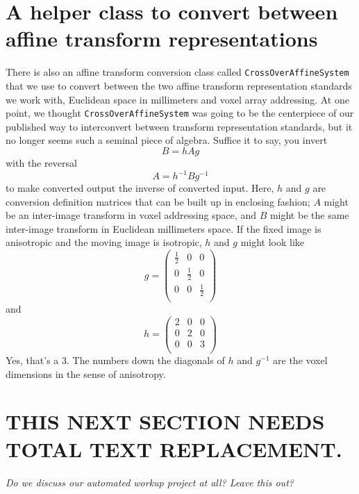 \documentclass [10pt,twocolumn,twoside,final,letterpaper]{report}
\newcommand{\bcode}{\texttt}
\begin{document}
\section{A helper class to convert between affine transform representations}
There is also an affine transform conversion class
called \bcode{CrossOverAffineSystem} that we use to convert
between the two affine transform representation standards we work with,
Euclidean space in millimeters and voxel array addressing.
At one point, we thought \bcode{CrossOverAffineSystem} was 
going to be the centerpiece of our published way to
interconvert between transform representation standards, but it no longer seems 
such a seminal piece of algebra.  Suffice it to say, you invert
\[B = h A g\] with the reversal \[A = h^{-1} B g^{-1}\] to make
converted output the inverse of converted input. Here, $h$ and $g$ are conversion
definition matrices that can be built up in enclosing fashion;
$A$ might be an inter-image transform in voxel addressing space, and $B$
might be the same inter-image transform in Euclidean millimeters space.
If the fixed image is anisotropic and the moving image is isotropic, $h$ and $g$ might look like
\begin{equation*}
 g = \left( \begin{array}{rrr}
            \frac{1}{2} & 0 & 0 \\
            0 & \frac{1}{2} & 0 \\
            0 & 0 & \frac{1}{2} \\
            \end{array} \right)
\end{equation*}
and
\begin{equation*}
 h = \left( \begin{array}{rrr}
            2 & 0 & 0 \\
            0 & 2 & 0 \\
            0 & 0 & 3 \\
            \end{array} \right)
\end{equation*}
Yes, that's a 3.  The numbers down the diagonals of $h$ and $g^{-1}$ are the 
voxel dimensions in the sense of anisotropy.

\section{THIS NEXT SECTION NEEDS TOTAL TEXT REPLACEMENT.}
\emph{Do we discuss our automated workup project at all?  Leave this out?}
\end{document}
